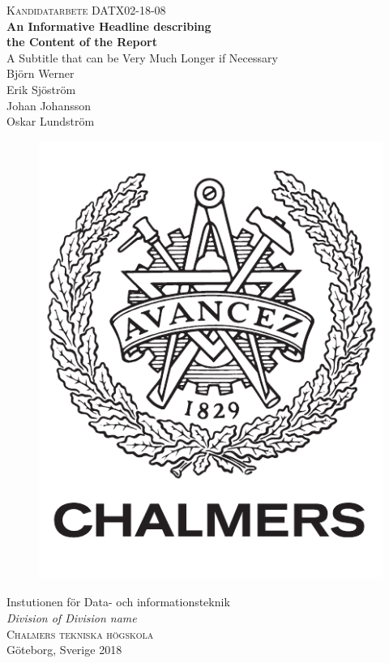 \newpage
\thispagestyle{empty}
\begin{center}
	\textsc{\large Kandidatarbete DATX02-18-08}\\[4cm]		%
	\textbf{\Large An Informative Headline describing\\ the Content of the Report} \\[1cm]
	{\large A Subtitle that can be Very Much Longer if Necessary}\\[1cm]
  {\large Björn Werner}\\
	{\large Erik Sjöström}\\
	{\large Johan Johansson}\\
  {\large Oskar Lundström}\\

	\vfill
	\begin{figure}[H]
	\centering
	\includegraphics[width=0.2\pdfpagewidth]{figure/auxiliary/logo_swe.pdf} \\
	\end{figure}	\vspace{5mm}

	Instutionen för Data- och informationsteknik \\
	\emph{Division of Division name}\\
	\textsc{Chalmers tekniska högskola} \\
	Göteborg, Sverige 2018 \\
\end{center}


